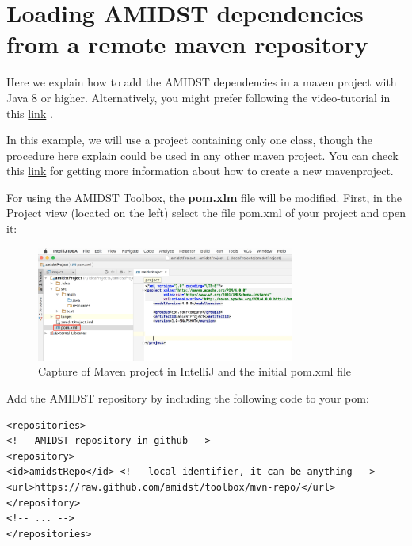 \documentclass[10pt,a4paper]{article}
\begin{document}
	
	\section{Loading AMIDST dependencies from a remote maven repository}








Here we explain how to add the AMIDST dependencies in a maven project with Java 8 or higher.  Alternatively, you might prefer following the video-tutorial in this \href{https://www.youtube.com/watch?v=i_X6cFo91LE}{link} .\newline

In this example, we will use a  project containing only one class, though the procedure here explain  could be used in any other maven project. You can check this \href{https://www.jetbrains.com/help/idea/2016.1/getting-started-with-maven.html}{link} for getting more information about how to create a new mavenproject.\newline

For using the AMIDST Toolbox, the \textbf{pom.xlm} file will be modified. First, in the Project view (located on the left) select the file pom.xml of your project and open it:\newline


\begin{figure}[h!]
	\centering 
	\includegraphics[width=8.5cm]{img/use_amidst05.png}
	\caption{Capture of Maven project in IntelliJ  and the initial pom.xml file}
	\label{fig:remoteDeps_initialPom}	
\end{figure}



\noindent Add the AMIDST repository by including the following code to your
pom:\newline

\begin{lstlisting}
<repositories>
<!-- AMIDST repository in github -->
<repository>
<id>amidstRepo</id> <!-- local identifier, it can be anything -->
<url>https://raw.github.com/amidst/toolbox/mvn-repo/</url>
</repository>
<!-- ... -->
</repositories>        
\end{lstlisting}
\end{document}
